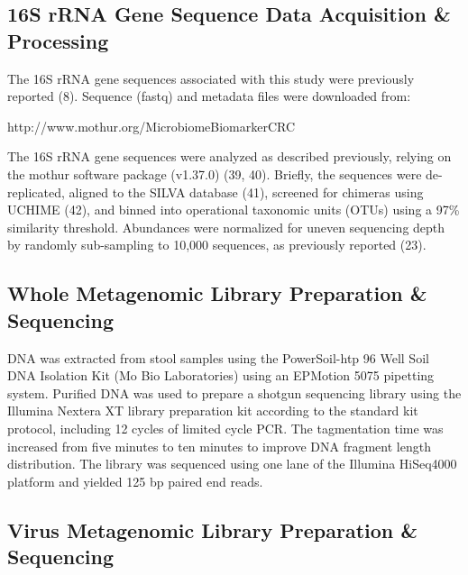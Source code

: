 \documentclass[12pt,]{article}
\begin{document}
\subsection{16S rRNA Gene Sequence Data Acquisition \&
Processing}\label{s-rrna-gene-sequence-data-acquisition-processing}

The 16S rRNA gene sequences associated with this study were previously
reported (8). Sequence (fastq) and metadata files were downloaded from:

http://www.mothur.org/MicrobiomeBiomarkerCRC

The 16S rRNA gene sequences were analyzed as described previously,
relying on the mothur software package (v1.37.0) (39, 40). Briefly, the
sequences were de-replicated, aligned to the SILVA database (41),
screened for chimeras using UCHIME (42), and binned into operational
taxonomic units (OTUs) using a 97\% similarity threshold. Abundances
were normalized for uneven sequencing depth by randomly sub-sampling to
10,000 sequences, as previously reported (23).

\subsection{Whole Metagenomic Library Preparation \&
Sequencing}\label{whole-metagenomic-library-preparation-sequencing}

DNA was extracted from stool samples using the PowerSoil-htp 96 Well
Soil DNA Isolation Kit (Mo Bio Laboratories) using an EPMotion 5075
pipetting system. Purified DNA was used to prepare a shotgun sequencing
library using the Illumina Nextera XT library preparation kit according
to the standard kit protocol, including 12 cycles of limited cycle PCR.
The tagmentation time was increased from five minutes to ten minutes to
improve DNA fragment length distribution. The library was sequenced
using one lane of the Illumina HiSeq4000 platform and yielded 125 bp
paired end reads.

\subsection{Virus Metagenomic Library Preparation \&
Sequencing}\label{virus-metagenomic-library-preparation-sequencing}
\end{document}
